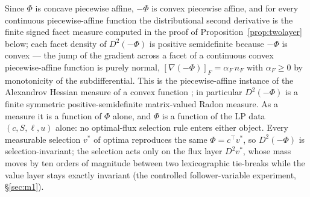 \documentclass[11pt,a4paper]{article}
\theoremstyle{plain}
\theoremstyle{definition}
\theoremstyle{remark}
\begin{document}
Since $\Phi$ is concave piecewise affine, $-\Phi$ is convex piecewise
affine, and for every continuous piecewise-affine function the
distributional second derivative is the finite signed facet measure
computed in the proof of Proposition~\ref{prop:twolayer} below; each
facet density of $D^{2}(-\Phi)$ is positive semidefinite because
$-\Phi$ is convex --- the jump of the gradient across a facet of a
continuous convex piecewise-affine function is purely normal,
$[\nabla(-\Phi)]_{F} = \alpha_F\, n_F$ with $\alpha_F \ge 0$ by
monotonicity of the subdifferential. This is the piecewise-affine
instance of the Alexandrov Hessian measure of a convex function
\citep{alexandrov1939}; in particular $D^{2}(-\Phi)$ is a finite
symmetric positive-semidefinite matrix-valued Radon measure. As a
measure it is a function of $\Phi$ alone, and $\Phi$ is a function
of the LP data $(c, S, \ell, u)$ alone: no optimal-flux selection
rule enters either object. Every measurable selection $v^{*}$ of
optima reproduces the same $\Phi = c^{\top}v^{*}$, so
$D^{2}(-\Phi)$ is selection-invariant; the selection acts only on
the flux layer $D^{2}v^{*}$, whose mass moves by ten orders of
magnitude between two lexicographic tie-breaks while the value
layer stays exactly invariant (the controlled follower-variable
experiment, \S\ref{sec:m1}).
\end{document}
